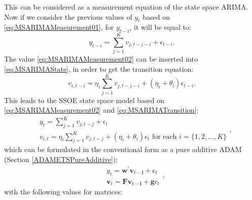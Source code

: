\documentclass[
]{book}
\theoremstyle{definition}
\theoremstyle{definition}
\theoremstyle{definition}
\theoremstyle{definition}
\theoremstyle{remark}
\begin{document}
This can be considered as a measurement equation of the state space ARIMA. Now if we consider the previous values of \(y_t\) based on \eqref{eq:MSARIMAMeasurement01}, for \(y_{t-i}\), it will be equal to:
\begin{equation}
  y_{t-i} = \sum_{j=1}^K v_{j,t-j-i} + \epsilon_{t-i} .
  \label{eq:MSARIMAMeasurement02}
\end{equation}
The value \eqref{eq:MSARIMAMeasurement02} can be inserted into \eqref{eq:MSARIMAState}, in order to get the transition equation:
\begin{equation}
  v_{i,t-i} = \eta_i \sum_{j=1}^K v_{j,t-j-i} + (\eta_i + \theta_i) \epsilon_{t-i}.
  \label{eq:MSARIMATransition}
\end{equation}
This leads to the SSOE state space model based on \eqref{eq:MSARIMAMeasurement02} and \eqref{eq:MSARIMATransition}:
\begin{equation}
  \begin{aligned}
    &{y}_{t} = \sum_{j=1}^K v_{j,t-j} + \epsilon_t \\
    &v_{i,t} = \eta_i \sum_{j=1}^K v_{j,t-j} + (\eta_i + \theta_i) \epsilon_{t} \text{ for each } i=\{1, 2, \dots, K \}
  \end{aligned},
  \label{eq:ADAMARIMAExpanded}
\end{equation}
which can be formulated in the conventional form as a pure additive ADAM (Section \ref{ADAMETSPureAdditive}):
\begin{equation*}
  \begin{aligned}
    &{y}_{t} = \mathbf{w}^\prime \mathbf{v}_{t-\mathbf{l}} + \epsilon_t \\
    &\mathbf{v}_{t} = \mathbf{F} \mathbf{v}_{t-\mathbf{l}} + \mathbf{g} \epsilon_t
  \end{aligned},
\end{equation*}
with the following values for matrices:
\end{document}
